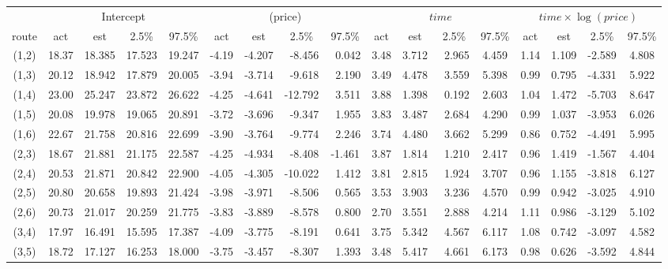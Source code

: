 \begin{sidewaystable}[p]
\centering
\begin{tabular}{c|cccc|cccc|cccc|cccc}
  \toprule
				& \multicolumn{4}{c|}{Intercept} & \multicolumn{4}{c|}{\log(price)} & \multicolumn{4}{c|}{$time$} & \multicolumn{4}{c}{$time \times \log(price)$} \\
	route & act & est & 2.5\% & 97.5\% & act & est & 2.5\% & 97.5\% & act & est & 2.5\% & 97.5\% & act & est & 2.5\% & 97.5\% \\ 
  \midrule
	(1,2) & 18.37 & 18.385 & 17.523 & 19.247 & -4.19 & -4.207 & ~-8.456 & ~0.042 & 3.48 & 3.712 & ~2.965 & 4.459 & 1.14 & 1.109 & -2.589 & 4.808 \\ 
  (1,3) & 20.12 & 18.942 & 17.879 & 20.005 & -3.94 & -3.714 & ~-9.618 & ~2.190 & 3.49 & 4.478 & ~3.559 & 5.398 & 0.99 & 0.795 & -4.331 & 5.922 \\ 
  (1,4) & 23.00 & 25.247 & 23.872 & 26.622 & -4.25 & -4.641 & -12.792 & ~3.511 & 3.88 & 1.398 & ~0.192 & 2.603 & 1.04 & 1.472 & -5.703 & 8.647 \\ 
  (1,5) & 20.08 & 19.978 & 19.065 & 20.891 & -3.72 & -3.696 & ~-9.347 & ~1.955 & 3.83 & 3.487 & ~2.684 & 4.290 & 0.99 & 1.037 & -3.953 & 6.026 \\ 
  (1,6) & 22.67 & 21.758 & 20.816 & 22.699 & -3.90 & -3.764 & ~-9.774 & ~2.246 & 3.74 & 4.480 & ~3.662 & 5.299 & 0.86 & 0.752 & -4.491 & 5.995 \\ 
  (2,3) & 18.67 & 21.881 & 21.175 & 22.587 & -4.25 & -4.934 & ~-8.408 & -1.461 & 3.87 & 1.814 & ~1.210 & 2.417 & 0.96 & 1.419 & -1.567 & 4.404 \\ 
  (2,4) & 20.53 & 21.871 & 20.842 & 22.900 & -4.05 & -4.305 & -10.022 & ~1.412 & 3.81 & 2.815 & ~1.924 & 3.707 & 0.96 & 1.155 & -3.818 & 6.127 \\ 
  (2,5) & 20.80 & 20.658 & 19.893 & 21.424 & -3.98 & -3.971 & ~-8.506 & ~0.565 & 3.53 & 3.903 & ~3.236 & 4.570 & 0.99 & 0.942 & -3.025 & 4.910 \\ 
  (2,6) & 20.73 & 21.017 & 20.259 & 21.775 & -3.83 & -3.889 & ~-8.578 & ~0.800 & 2.70 & 3.551 & ~2.888 & 4.214 & 1.11 & 0.986 & -3.129 & 5.102 \\ 
  (3,4) & 17.97 & 16.491 & 15.595 & 17.387 & -4.09 & -3.775 & ~-8.191 & ~0.641 & 3.75 & 5.342 & ~4.567 & 6.117 & 1.08 & 0.742 & -3.097 & 4.582 \\ 
  (3,5) & 18.72 & 17.127 & 16.253 & 18.000 & -3.75 & -3.457 & ~-8.307 & ~1.393 & 3.48 & 5.417 & ~4.661 & 6.173 & 0.98 & 0.626 & -3.592 & 4.844 \\ 

\end{tabular}
\end{sidewaystable}
